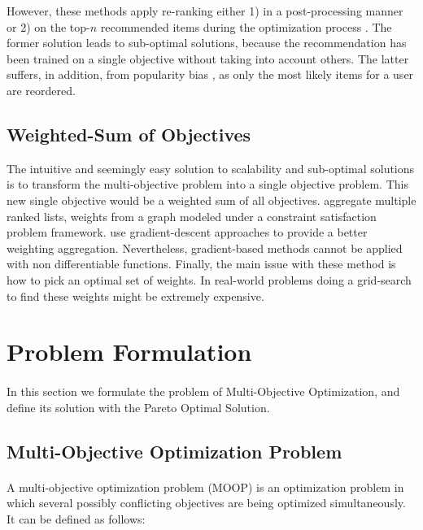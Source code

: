 \documentclass[letterpaper]{article}
\begin{document}
However, these methods apply re-ranking either 1) in a post-processing manner \cite{jugovac2017efficient} or 2) on the top-$n$ recommended items during the optimization process \cite{di2017adaptive}. The former solution leads to sub-optimal solutions, because the recommendation has been trained on a single objective without taking into account others. The latter suffers, in addition, from popularity bias \cite{abdollahpouri2017controlling}, as only the most likely items for a user are reordered.

\subsection{Weighted-Sum of Objectives}

The intuitive and seemingly easy solution to scalability and sub-optimal solutions is to transform the multi-objective problem into a single objective problem. This new single objective would be a weighted sum of all objectives. \cite{ribeiro2015multiobjective} aggregate multiple ranked lists, weights from a graph modeled under a constraint satisfaction problem framework\cite{Torrens2002a}. \cite{Lin:2019:PAM:3298689.3346998} use gradient-descent approaches to provide a better weighting aggregation. Nevertheless, gradient-based methods cannot be applied with non differentiable functions. Finally, the main issue with these method is how to pick an optimal set of weights. In real-world problems doing a grid-search to find these weights might be extremely expensive.

\section{Problem Formulation}
\paragraph{}
In this section we formulate the problem of Multi-Objective Optimization, and define its solution with the Pareto Optimal Solution.

\subsection{Multi-Objective Optimization Problem}
\paragraph{}
A multi-objective optimization problem (MOOP) is an optimization problem in which several possibly conflicting objectives are being optimized simultaneously. It can be defined as follows:
\end{document}
